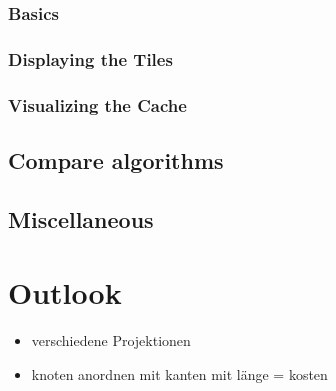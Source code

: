 \documentclass
[
	paper = a4,
    pagesize,
	12 pt,
	oneside,                       %
    open = right,
	DIV = calc,
	BCOR = 0 mm,                   %
	bibtotoc
]
{scrbook}
\begin{document}
\subsection{Basics}


\subsection{Displaying the Tiles}


\subsection{Visualizing the Cache}


\section{Compare algorithms}


\section{Miscellaneous}

\chapter{Outlook}
\begin{itemize}
	\item verschiedene Projektionen
	\item knoten anordnen mit kanten mit länge = kosten
\end{itemize}
\end{document}
